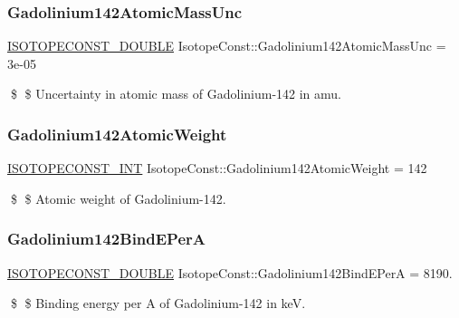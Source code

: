 \subsubsection{\texorpdfstring{Gadolinium142\+Atomic\+Mass\+Unc}{Gadolinium142AtomicMassUnc}}
{\footnotesize\ttfamily \mbox{\hyperlink{group___isotope_const-_macros_ga8f45a7272ce02c0b4c65c44636ed719a}{I\+S\+O\+T\+O\+P\+E\+C\+O\+N\+S\+T\+\_\+\+D\+O\+U\+B\+LE}} Isotope\+Const\+::\+Gadolinium142\+Atomic\+Mass\+Unc = 3e-\/05}

\$ \$ Uncertainty in atomic mass of Gadolinium-\/142 in amu. \mbox{\label{group___isotope_const-_gadolinium-_gd142_ga6a06a53b4a87d355c2a4e9f3768c9738}} 
\subsubsection{\texorpdfstring{Gadolinium142\+Atomic\+Weight}{Gadolinium142AtomicWeight}}
{\footnotesize\ttfamily \mbox{\hyperlink{group___isotope_const-_macros_ga5f18360b3e99483a35c32d789e62621c}{I\+S\+O\+T\+O\+P\+E\+C\+O\+N\+S\+T\+\_\+\+I\+NT}} Isotope\+Const\+::\+Gadolinium142\+Atomic\+Weight = 142}

\$ \$ Atomic weight of Gadolinium-\/142. \mbox{\label{group___isotope_const-_gadolinium-_gd142_ga792c1c6dec59dcadfd89eb7ef090b482}} 
\subsubsection{\texorpdfstring{Gadolinium142\+Bind\+E\+PerA}{Gadolinium142BindEPerA}}
{\footnotesize\ttfamily \mbox{\hyperlink{group___isotope_const-_macros_ga8f45a7272ce02c0b4c65c44636ed719a}{I\+S\+O\+T\+O\+P\+E\+C\+O\+N\+S\+T\+\_\+\+D\+O\+U\+B\+LE}} Isotope\+Const\+::\+Gadolinium142\+Bind\+E\+PerA = 8190.}

\$ \$ Binding energy per A of Gadolinium-\/142 in keV. \mbox{\label{group___isotope_const-_gadolinium-_gd142_gabb7617564c8e02efcedad1c4e4114df6}} 
